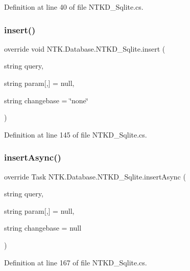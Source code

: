 Definition at line 40 of file N\+T\+K\+D\+\_\+\+Sqlite.\+cs.

\mbox{\label{class_n_t_k_1_1_database_1_1_n_t_k_d___sqlite_afdb261843de52ad7a74c22e30ff94825}} 
\subsubsection{\texorpdfstring{insert()}{insert()}}
{\footnotesize\ttfamily override void N\+T\+K.\+Database.\+N\+T\+K\+D\+\_\+\+Sqlite.\+insert (\begin{DoxyParamCaption}\item[{string}]{query,  }\item[{string}]{param\mbox{[},\mbox{]} = {\ttfamily null},  }\item[{string}]{changebase = {\ttfamily \char`\"{}none\char`\"{}} }\end{DoxyParamCaption})}



Definition at line 145 of file N\+T\+K\+D\+\_\+\+Sqlite.\+cs.

\mbox{\label{class_n_t_k_1_1_database_1_1_n_t_k_d___sqlite_a837d400079384578838d759687f87db3}} 
\subsubsection{\texorpdfstring{insertAsync()}{insertAsync()}}
{\footnotesize\ttfamily override Task N\+T\+K.\+Database.\+N\+T\+K\+D\+\_\+\+Sqlite.\+insert\+Async (\begin{DoxyParamCaption}\item[{string}]{query,  }\item[{string}]{param\mbox{[},\mbox{]} = {\ttfamily null},  }\item[{string}]{changebase = {\ttfamily null} }\end{DoxyParamCaption})}



Definition at line 167 of file N\+T\+K\+D\+\_\+\+Sqlite.\+cs.

\mbox{\label{class_n_t_k_1_1_database_1_1_n_t_k_d___sqlite_a8ba9f96975a7bb0597ff5c0e0d5d054e}} 

